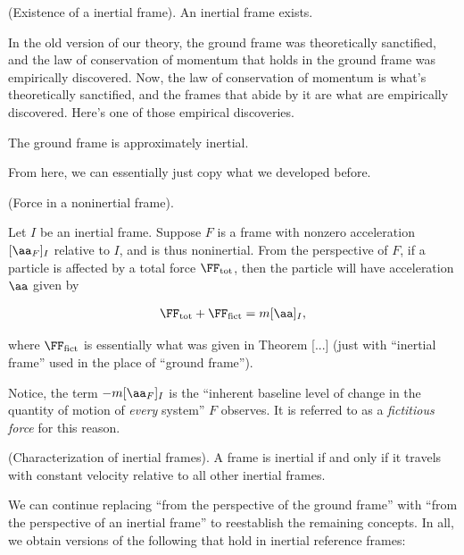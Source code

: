 \documentclass{article}
\begin{document}
\begin{axiom}
	(Existence of a inertial frame). An inertial frame exists.
\end{axiom}

In the old version of our theory, the ground frame was theoretically sanctified, and the law of conservation of momentum that holds in the ground frame was empirically discovered. Now, the law of conservation of momentum is what's theoretically sanctified, and the frames that abide by it are what are empirically discovered. Here's one of those empirical discoveries.

\begin{theorem}
	The ground frame is approximately inertial.
\end{theorem}

From here, we can essentially just copy what we developed before.

\begin{theorem}
	(Force in a noninertial frame).
	
	Let $I$ be an inertial frame. Suppose $F$ is a frame with nonzero acceleration $[\aa_F]_I$ relative to $I$, and is thus noninertial. From the perspective of $F$, if a particle is affected by a total force $\FF_{\text{tot}}$, then the particle will have acceleration $\aa$ given by
	
	\begin{align*}
		\FF_{\text{tot}} + \FF_{\text{fict}} = m[\aa]_I,
	\end{align*}
	
	where $\FF_{\text{fict}}$ is essentially what was given in Theorem [...] (just with ``inertial frame'' used in the place of ``ground frame'').
	
	Notice, the term $-m[\aa_F]_I$ is the ``inherent baseline level of change in the quantity of motion of \textit{every} system'' $F$ observes. It is referred to as a \textit{fictitious force} for this reason.
\end{theorem}

\begin{theorem}
	(Characterization of inertial frames). A frame is inertial if and only if it travels with constant velocity relative to all other inertial frames.
\end{theorem}

We can continue replacing ``from the perspective of the ground frame'' with ``from the perspective of an inertial frame'' to reestablish the remaining concepts. In all, we obtain versions of the following that hold in inertial reference frames:
\end{document}
